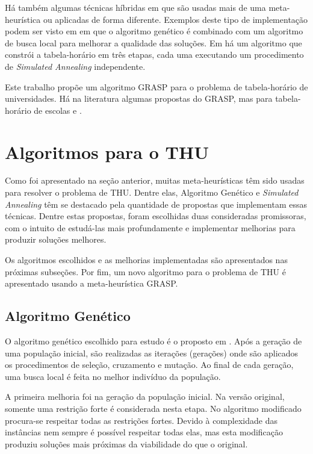 \documentclass[11pt]{article}
\begin{document}
Há também algumas técnicas híbridas em que são usadas mais de uma meta-heurística ou aplicadas de forma diferente. Exemplos deste tipo de implementação podem ser visto em \cite{massoodian2008} em que o algoritmo genético é combinado com um algoritmo de busca local para melhorar a qualidade das soluções. Em \cite{3-phaseSA} há um algoritmo que constrói a tabela-horário em três etapas, cada uma executando um procedimento de \textit{Simulated Annealing} independente.

Este trabalho propõe um algoritmo GRASP para o problema de tabela-horário de universidades. Há na literatura algumas propostas do GRASP, mas para tabela-horário de escolas \cite{Souza:2004} e \cite{Vieira_agrasp}.



\section{Algoritmos para o THU}
\label{sec:algoritmos}

Como foi apresentado na seção anterior, muitas meta-heurísticas têm sido usadas para resolver o problema de THU. Dentre elas, Algoritmo Genético e \textit{Simulated Annealing} têm se destacado pela quantidade de propostas que implementam essas técnicas. Dentre estas propostas, foram escolhidas duas consideradas promissoras, com o intuito de estudá-las mais profundamente e implementar melhorias para produzir soluções melhores.

Os algoritmos escolhidos e as melhorias implementadas são apresentados nas próximas subseções. Por fim, um novo algoritmo para o problema de THU é apresentado usando a meta-heurística GRASP.

\subsection{Algoritmo Genético}

O algoritmo genético escolhido para estudo é o proposto em \cite{massoodian2008}. Após a geração de uma população inicial, são realizadas as iterações (gerações) onde são aplicados os procedimentos de seleção, cruzamento e mutação. Ao final de cada geração, uma busca local é feita no melhor indivíduo da população.

A primeira melhoria foi na geração da população inicial. Na versão original, somente uma restrição forte é considerada nesta etapa. No algoritmo modificado procura-se respeitar todas as restrições fortes. Devido à complexidade das instâncias nem sempre é possível respeitar todas elas, mas esta modificação produziu soluções mais próximas da viabilidade do que o original.
\end{document}
